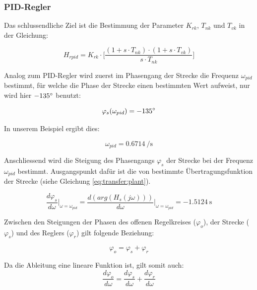 \subsubsection*{PID-Regler}

Das schlussendliche Ziel ist die Bestimmung der Parameter $K_{rk}$, $T_{nk}$ und $T_{vk}$
in der Gleichung:

\begin{equation} \label{eq:pid:target}
    H_{rpid} = K_{rk} \cdot \biggl[ \frac{(1 + s \cdot T_{nk}) \cdot (1 + s \cdot T_{vk}) }{ s \cdot T_{nk} } \biggr]
\end{equation}

Analog  zum PID-Regler  wird zuerst  im  Phasengang der  Strecke die  Frequenz
$\omega_{pid}$  bestimmt, f\"ur  welche  die Phase  der Strecke  einen bestimmten
Wert aufweist, nur wird hier $-135\degree$ benutzt:

\begin{equation} \label{eq:pid:phi_s}
    \varphi_s(\omega_{pid}) = -135 \degree
\end{equation}

In unserem Beispiel ergibt dies:

\begin{equation} \label{eq:pid:omega_pid}
    \omega_{pid} = \SI{0.6714}{\per\second}
\end{equation}

Anschliessend wird  die Steigung des  Phasengangs $\varphi_s$ der  Strecke bei
der  Frequenz  $\omega_{pid}$  bestimmt. Ausgangspunkt  daf\"ur  ist  die  von
 bestimmte  \"Ubertragungsfunktion der Strecke  (siehe Gleichung
\ref{eq:transfer:plant}).

\begin{equation} \label{eq:transfer:plant:derivative}
    \frac{d\varphi_s}{d\omega} \biggr \rvert_{\omega=\omega_{pid}}
        = \frac{d(arg(H_s(j\omega)))}{d\omega} \biggr \rvert_{\omega=\omega_{pid}}
        = \SI{-1.5124}{\second}
\end{equation}

Zwischen den Steigungen der Phasen des offenen Regelkreises ($\varphi_o$), der
Strecke ($\varphi_s$) und des Reglers ($\varphi_r$) gilt folgende Beziehung:

\begin{equation} \label{eq:pid:phi_sum}
    \varphi_o = \varphi_s + \varphi_r
\end{equation}

Da die Ableitung eine lineare Funktion ist, gilt somit auch: 
\begin{equation} \label{eq:pid:dphi_sum}
    \frac{d\varphi_o}{d\omega} = \frac{d\varphi_s}{d\omega} + \frac{d\varphi_r}{d\omega}
\end{equation}

